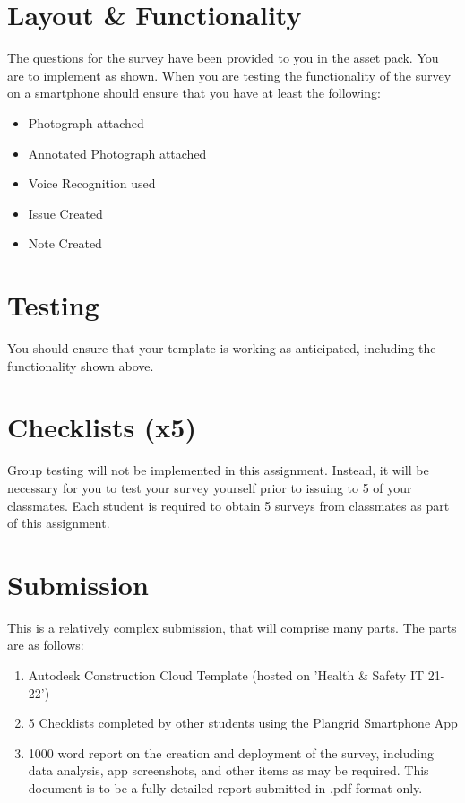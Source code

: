 \newpage
\section*{Layout \& Functionality}

The questions for the survey have been provided to you in the asset pack.  You are to implement as shown.  When you are testing the functionality of the survey on a smartphone should ensure that you have at least the following:

\begin{itemize}
	\item Photograph attached
	\item Annotated Photograph attached
	\item Voice Recognition used
	\item Issue Created
	\item Note Created
\end{itemize}

\section*{Testing}
You should ensure that your template is working as anticipated, including the functionality shown above.


\newpage
\section*{Checklists (x5)}
Group testing will not be implemented in this assignment.  Instead, it will be necessary for you to test your survey yourself prior to issuing to 5 of your classmates.  Each student is required to obtain 5 surveys from classmates as part of this assignment.


\section*{Submission}
This is a relatively complex submission, that will comprise many parts.  The parts are as follows:
\begin{enumerate}
	\item Autodesk Construction Cloud Template (hosted on 'Health \& Safety IT 21-22')
	\item 5 Checklists completed by other students using the Plangrid Smartphone App
	\item 1000 word report on the creation and deployment of the survey, including data analysis, app screenshots, and other items as may be required.  This document is to be a fully detailed report submitted in .pdf format only.
\end{enumerate}



